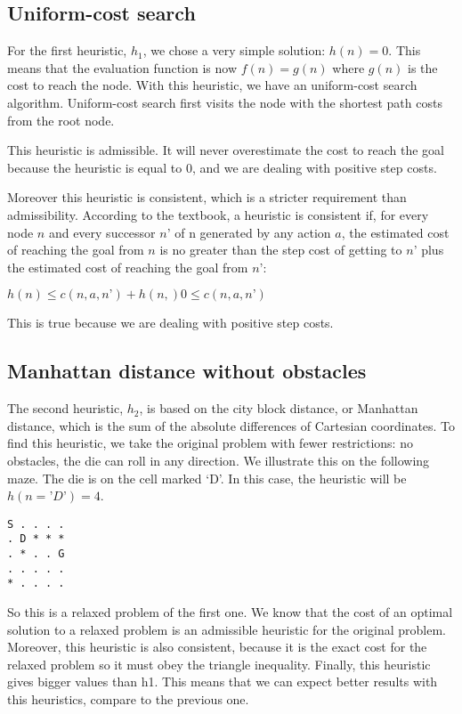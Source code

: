 \documentclass[]{article}
\begin{document}
\subsection{Uniform-cost search}
For the first heuristic, $h_1$, we chose a very simple solution: $h(n) = 0$.
This means that the evaluation function is now $f(n) = g(n)$ where $g(n)$ is the cost to reach the node.
With this heuristic, we have an uniform-cost search algorithm.
Uniform-cost search first visits the node with the shortest path costs from the root node.

This heuristic is admissible.
It will never overestimate the cost to reach the goal because the heuristic is equal to 0, and we are dealing with positive step costs.

Moreover this heuristic is consistent, which is a stricter requirement than admissibility.
According to the textbook, a heuristic is consistent if, for every node $n$ and every successor $n’$ of n generated by any action $a$, the estimated cost of reaching the goal from $n$ is no greater than the step cost of getting to $n’$ plus the estimated cost of reaching the goal from $n’$:

$
h(n) \leq c(n,a,n’) + h(n,)

0 \leq c(n,a,n’)
$

This is true because we are dealing with positive step costs.

\subsection{Manhattan distance without obstacles}
The second heuristic, $h_2$, is based on the city block distance, or Manhattan distance, which is the sum of the absolute differences of Cartesian coordinates.
To find this heuristic, we take the original problem with fewer restrictions: no obstacles, the die can roll in any direction. 
We illustrate this on the following maze.
The die is on the cell marked ‘D’.
In this case, the heuristic will be $h(n=’D’) = 4$.

\begin{lstlisting}
S . . . .
. D * * *
. * . . G
. . . . .
* . . . .
\end{lstlisting}

So this is a relaxed problem of the first one.
We know that the cost of an optimal solution to a relaxed problem is an admissible heuristic for the original problem.
Moreover, this heuristic is also consistent, because it is the exact cost for the relaxed problem so it must obey the triangle inequality.
Finally, this heuristic gives bigger values than h1. This means that we can expect better results with this heuristics, compare to the previous one. 
\end{document}
